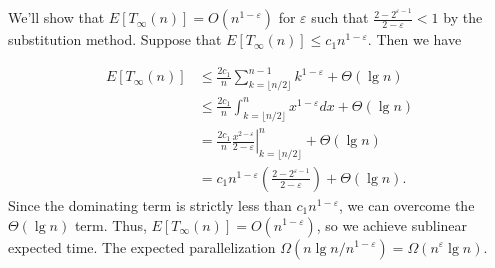 \documentclass{article}
\begin{document}
\begin{enumerate}[a.]
We'll show that $E[T_\infty(n)] = O(n^{1-\varepsilon})$ for $\varepsilon$ such that $\frac{2-2^{\varepsilon - 1}}{2 - \varepsilon} < 1$ by the substitution method.  Suppose that $E[T_\infty(n)] \leq c_1n^{1-\varepsilon}$.  Then we have

\begin{align*}
E[T_\infty(n)] &\leq  \frac{2c_1}{n}\sum_{k=\lfloor n/2 \rfloor}^{n-1} k^{1-\varepsilon} + \Theta(\lg n) \\
& \leq  \frac{2c_1}{n}\int_{k=\lfloor n/2 \rfloor}^{n}x^{1-\varepsilon}dx + \Theta(\lg n) \\
&= \frac{2c_1}{n}\left. \frac{x^{2-\varepsilon}}{2-\varepsilon}\right|_{k=\lfloor n/2 \rfloor}^{n} + \Theta(\lg n) \\
&= c_1n^{1 - \varepsilon} \left( \frac{2-2^{\varepsilon - 1}}{2 - \varepsilon} \right) + \Theta(\lg n).
\end{align*}
Since the dominating term is strictly less than $c_1n^{1-\varepsilon}$, we can overcome the $\Theta(\lg n)$ term. Thus, $E[T_\infty(n)] = O(n^{1-\varepsilon})$, so we achieve sublinear expected time. The expected parallelization $\Omega(n \lg n / n^{1-\varepsilon}) = \Omega(n^{\varepsilon} \lg n)$. 

\end{enumerate}
\end{document}
